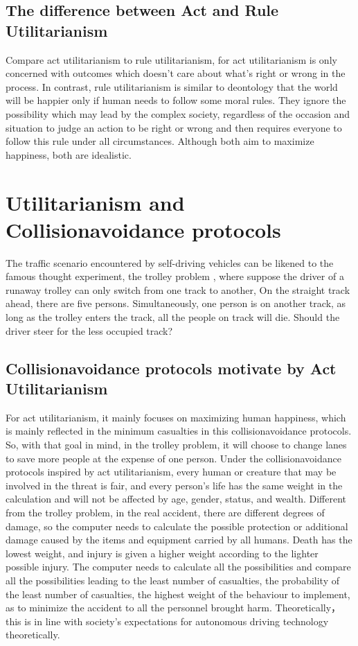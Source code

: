 \documentclass[9pt,twocolumn,twoside,lineno]{gsajnl}
\begin{document}
\subsection{The difference between Act and Rule Utilitarianism}
Compare act utilitarianism to rule utilitarianism, for act utilitarianism is only concerned with outcomes which doesn't care about what's right or wrong in the process. In contrast, rule utilitarianism is similar to deontology that the world will be happier only if human needs to follow some moral rules. They ignore the possibility which may lead by the complex society, regardless of the occasion and situation to judge an action to be right or wrong and then requires everyone to follow this rule under all circumstances. Although both aim to maximize happiness, both are idealistic.


\section{Utilitarianism and Collisionavoidance protocols}
The traffic scenario encountered by self-driving vehicles can be likened to the famous thought experiment, the trolley problem \citep{foot1967problem, judith1985trolley}, where suppose the driver of a runaway trolley can only switch from one track to another, On the straight track ahead, there are five persons. Simultaneously, one person is on another track, as long as the trolley enters the track, all the people on track will die. Should the driver steer for the less occupied track?

\subsection{Collisionavoidance protocols motivate by Act Utilitarianism} 
For act utilitarianism, it mainly focuses on maximizing human happiness, which is mainly reflected in the minimum casualties in this collisionavoidance protocols.   So, with that goal in mind, in the trolley problem, it will choose to change lanes to save more people at the expense of one person.   Under the collisionavoidance protocols inspired by act utilitarianism, every human or creature that may be involved in the threat is fair, and every person's life has the same weight in the calculation and will not be affected by age, gender, status, and wealth.   Different from the trolley problem, in the real accident, there are different degrees of damage, so the computer needs to calculate the possible protection or additional damage caused by the items and equipment carried by all humans.   Death has the lowest weight, and injury is given a higher weight according to the lighter possible injury.   The computer needs to calculate all the possibilities and compare all the possibilities leading to the least number of casualties, the probability of the least number of casualties, the highest weight of the behaviour to implement, as to minimize the accident to all the personnel brought harm.   Theoretically，this is in line with society's expectations for autonomous driving technology theoretically.
\end{document}
